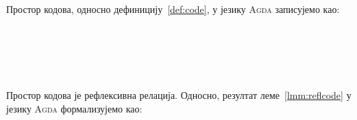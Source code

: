 Простор кодова, односно дефиницију~\ref{def:code}, у језику \textsc{Agda} записујемо као:
\begin{code}%
\>[0]\AgdaSpace{}%
\AgdaSymbol{:}\AgdaSpace{}%
\AgdaSpace{}%
\AgdaSpace{}%
\AgdaSpace{}%
\AgdaSpace{}%
\AgdaSpace{}%
\<%
\\
\>[0]\AgdaSpace{}%
\AgdaSpace{}%
\AgdaSpace{}%
\AgdaSymbol{=}\AgdaSpace{}%
\<%
\\
\>[0]\AgdaSpace{}%
\AgdaSpace{}%
\AgdaSymbol{(}\AgdaSpace{}%
\AgdaSymbol{)}\AgdaSpace{}%
\AgdaSymbol{=}\AgdaSpace{}%
\<%
\\
\>[0]\AgdaSpace{}%
\AgdaSymbol{(}\AgdaSpace{}%
\AgdaSymbol{)}\AgdaSpace{}%
\AgdaSpace{}%
\AgdaSymbol{=}\AgdaSpace{}%
\<%
\\
\>[0]\AgdaSpace{}%
\AgdaSymbol{(}\AgdaSpace{}%
\AgdaSymbol{)}\AgdaSpace{}%
\AgdaSymbol{(}\AgdaSpace{}%
\AgdaSymbol{)}\AgdaSpace{}%
\AgdaSymbol{=}\AgdaSpace{}%
\AgdaSpace{}%
\AgdaSpace{}%
\<%
\end{code}

Простор кодова је рефлексивна релација. Односно, резултат леме~\ref{lmm:reflcode} у језику \textsc{Agda} формализујемо као:
\begin{code}%
\>[0]\AgdaSpace{}%
\AgdaSymbol{:}\AgdaSpace{}%
\AgdaSymbol{(}\AgdaSpace{}%
\AgdaSymbol{:}\AgdaSpace{}%
\AgdaSymbol{)}\AgdaSpace{}%
\AgdaSpace{}%
\AgdaSpace{}%
\AgdaSpace{}%
\<%
\\
\>[0]\AgdaSpace{}%
%
\>[21]\AgdaSymbol{=}\AgdaSpace{}%
\<%
\\
\>[0]\AgdaSpace{}%
\AgdaSymbol{(}\AgdaSpace{}%
\AgdaSymbol{)}\AgdaSpace{}%
\AgdaSymbol{=}\AgdaSpace{}%
\AgdaSpace{}%
\<%
\end{code}

